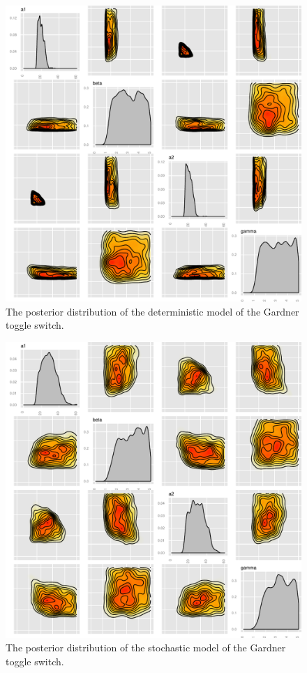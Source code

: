 \begin{figure}[p]
\centering
\includegraphics[scale=0.7 ]{chapterModelling/images/Gardner/wide_var/posterior_deter_high_mean.pdf}
\caption{The posterior distribution of the deterministic model of the Gardner toggle switch.}
\label{fig:Gard_post_det_high}
\end{figure}
\newpage

\begin{figure}[p]
\centering
\includegraphics[scale=0.7]{chapterModelling/images/Gardner/wide_var/posterior_stch_high_mean.pdf}
\caption{The posterior distribution of the stochastic model of the Gardner toggle switch.}
\label{fig:Gard_post_stch}
\end{figure}

